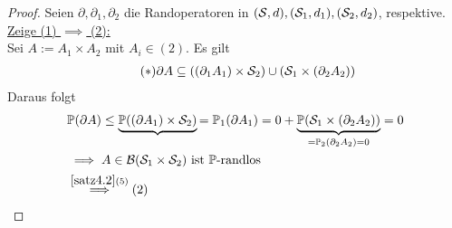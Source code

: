 \begin{proof}
	Seien $\partial,\partial_1,\partial_2$ die Randoperatoren in $(\S,d),(\S_1,d_1),(\S_2,d_2)$, respektive.\nl
	\underline{Zeige (1) $\implies$ (2):}\\
	Sei $A:=A_1\times A_2$ mit $A_i\in(2)$. 
	Es gilt
	\begin{align}\label{eqProof4.19Stern}\tag{$\ast$}
		\partial A\subseteq((\partial_1 A_1)\times\S_2)\cup(\S_1\times(\partial_2 A_2))
	\end{align}
	Daraus folgt
	\begin{align*}
		&\P(\partial A)\leq \underbrace{\P((\partial A_1)\times\S_2)}{=\P_1(\partial A_1)=0}+\underbrace{\P(\S_1\times(\partial_2 A_2))}_ {=\P_2(\partial_2 A_2)=0}=0\\
		&\implies
		A\in\B(\S_1\times\S_2)\text{ ist $\P$-randlos}\\
		&\stackrel{\ref{satz4.2}(5)}{\implies}(2)
	\end{align*}


\end{proof}
